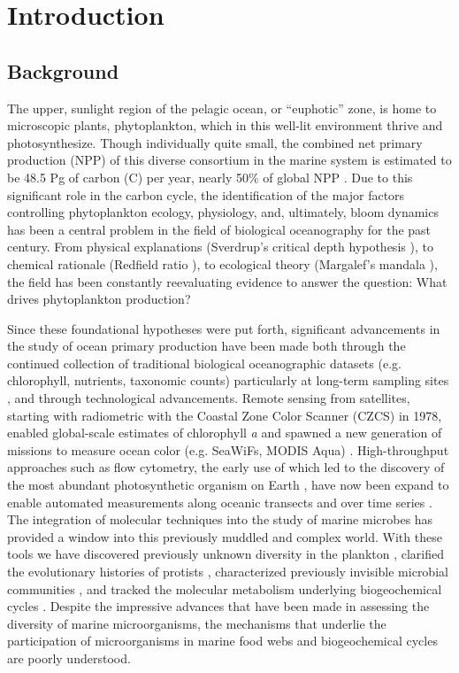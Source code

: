 
\chapter{Introduction}
\raggedbottom
\clearpage
\section{Background}
The upper, sunlight region of the pelagic ocean, or ``euphotic'' zone, is home to microscopic plants, phytoplankton, which in this well-lit environment thrive and photosynthesize. Though individually quite small, the combined net primary production (NPP) of this diverse consortium in the marine system is estimated to be 48.5 Pg of carbon (C) per year, nearly 50\% of global NPP \citep{Longhurst1995, Field1998}. Due to this significant role in the carbon cycle, the identification of the major factors controlling phytoplankton ecology, physiology, and, ultimately, bloom dynamics has been a central problem in the field of biological oceanography for the past century. From physical explanations (Sverdrup's critical depth hypothesis \citep{Sverdrup1953}), to chemical rationale (Redfield ratio \citep{Redfield1958}), to ecological theory (Margalef's mandala \citep{Margalef1978}), the field has been constantly reevaluating evidence to answer the question: What drives phytoplankton production?\par

Since these foundational hypotheses were put forth, significant advancements in the study of ocean primary production have been made both through the continued collection of traditional biological oceanographic datasets (e.g. chlorophyll, nutrients, taxonomic counts) particularly at long-term sampling sites \citep{Karl1996, Steinberg2001,Smith2003, Li1998}, and through technological advancements. Remote sensing from satellites, starting with radiometric with the Coastal Zone Color Scanner (CZCS) in 1978, enabled global-scale estimates of chlorophyll \textit{a} and spawned a new generation of missions to measure ocean color (e.g. SeaWiFs, MODIS Aqua) \citep{McClain2009}. High-throughput approaches such as flow cytometry, the early use of which led to the discovery of the most abundant photosynthetic organism on Earth \citep{Chisholm1988}, have now been expand to enable automated measurements along oceanic transects \citep{Swalwell2011, Ribalet2015} and over time series \citep{Olson2003}. The integration of molecular techniques into the study of marine microbes has provided a window into this previously muddled and complex world. With these tools we have discovered previously unknown diversity in the plankton \citep{Lopez-Garcia2001}, clarified the evolutionary histories of protists \citep{Keeling2005}, characterized previously invisible microbial communities \citep{Fuhrman1993}, and tracked the molecular metabolism underlying biogeochemical cycles \citep{Konneke2005}. Despite the impressive advances that have been made in assessing the diversity of marine microorganisms, the mechanisms that underlie the participation of microorganisms in marine food webs and biogeochemical cycles are poorly understood.

